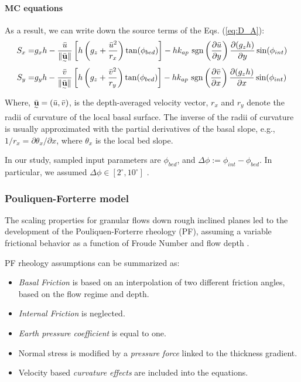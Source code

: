 \documentclass{article}
\begin{document}
\paragraph{MC equations} As a result, we can write down the source terms of the Eqs. (\ref{eq:D_A}):
\begin{eqnarray}\label{S_terms_MC}
S_x =& g_x h  - \frac{\bar{u}}{\| \underset{^\sim}{\bar{\textbf u}} \|} \left[h\left(g_z+\frac{\bar{u}^2}{r_x}\right)\tan(\phi_{bed})\right] - h k_{ap} \ {\rm sgn}\left(\frac{\partial \bar{u}}{\partial y}\right) \frac{\partial (g_z h)}{\partial y} \sin(\phi_{int}) \nonumber \\
 S_y =& g_y h  - \frac{\bar{v}}{\| \underset{^\sim}{\bar{\textbf u}} \|} \left[h\left(g_z +\frac{\bar{v}^2}{r_y}\right)\tan(\phi_{bed})\right] - h k_{ap} \ {\rm sgn}\left({\frac{\partial \bar{v}}{\partial x}}\right) \frac{\partial (g_z h)}{\partial x} \sin(\phi_{int})
\end{eqnarray}
Where, $\underset{^\sim}{\bar{\textbf u}} = (\bar{u} , \bar{v})$, is the depth-averaged velocity vector, $r_x$ and $r_y$ denote the radii of curvature
of the local basal surface. The inverse of the radii of curvature is usually approximated with the partial derivatives of the basal slope, e.g., $1/r_x = \partial \theta_x/\partial x$, where $\theta_x$ is the local bed slope.

In our study, sampled input parameters are $\phi_{bed}$, and $\Delta \phi:=\phi_{int}-\phi_{bed}$. In particular, we assumed $\Delta \phi \in [2^{\mathrm{\circ}}, 10^{\mathrm{\circ}}]$ \citep{Dalbey2008}.

\subsubsection{Pouliquen-Forterre model}\label{PFM}
The scaling properties for granular flows down rough inclined planes led to the development of the Pouliquen-Forterre rheology (PF), assuming a variable frictional behavior as a function of Froude Number and flow depth \citep{Pouliquen1999, ForterrePouliquen2002, PouliquenForterre2002, ForterrePouliquen2003}.

PF rheology assumptions can be summarized as:
\begin{itemize}
\item \textit{Basal Friction} is based on an interpolation of two different friction angles, based on the flow regime and depth.

\item \textit{Internal Friction} is neglected.

\item \textit{Earth pressure coefficient} is equal to one.

\item Normal stress is modified by a \textit{pressure force} linked to the thickness gradient.

\item Velocity based \textit{curvature effects} are included into the equations.
\end{itemize}
\end{document}

